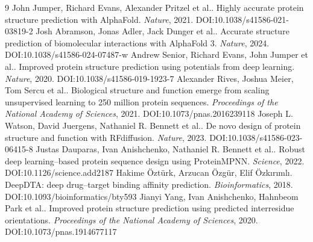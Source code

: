 \documentclass[11pt]{article}
\begin{document}
\begin{thebibliography}{9}
 John Jumper, Richard Evans, Alexander Pritzel et al.. Highly accurate protein structure prediction with AlphaFold. \emph{Nature}, 2021. DOI:10.1038/s41586-021-03819-2
 Josh Abramson, Jonas Adler, Jack Dunger et al.. Accurate structure prediction of biomolecular interactions with AlphaFold 3. \emph{Nature}, 2024. DOI:10.1038/s41586-024-07487-w
 Andrew Senior, Richard Evans, John Jumper et al.. Improved protein structure prediction using potentials from deep learning. \emph{Nature}, 2020. DOI:10.1038/s41586-019-1923-7
 Alexander Rives, Joshua Meier, Tom Sercu et al.. Biological structure and function emerge from scaling unsupervised learning to 250 million protein sequences. \emph{Proceedings of the National Academy of Sciences}, 2021. DOI:10.1073/pnas.2016239118
 Joseph L. Watson, David Juergens, Nathaniel R. Bennett et al.. De novo design of protein structure and function with RFdiffusion. \emph{Nature}, 2023. DOI:10.1038/s41586-023-06415-8
 Justas Dauparas, Ivan Anishchenko, Nathaniel R. Bennett et al.. Robust deep learning–based protein sequence design using ProteinMPNN. \emph{Science}, 2022. DOI:10.1126/science.add2187
 Hakime Öztürk, Arzucan Özgür, Elif Özkırımlı. DeepDTA: deep drug–target binding affinity prediction. \emph{Bioinformatics}, 2018. DOI:10.1093/bioinformatics/bty593
 Jianyi Yang, Ivan Anishchenko, Hahnbeom Park et al.. Improved protein structure prediction using predicted interresidue orientations. \emph{Proceedings of the National Academy of Sciences}, 2020. DOI:10.1073/pnas.1914677117
\end{thebibliography}
\end{document}
